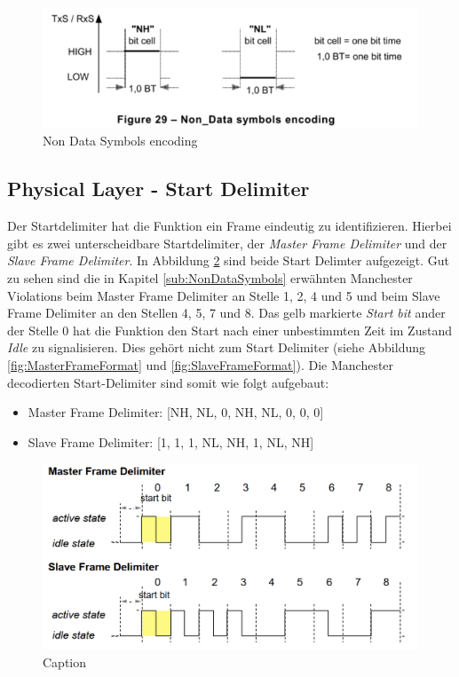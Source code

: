 \begin{figure}[H]
    \centering
    \includegraphics[width = 0.7 \textwidth]{Figures/Chap2/Grundlagen/MVB_DOKU/Layer/Non_Data_Symbol.png}
    \caption{Non Data Symbols encoding}
    \label{fig:NonDataSymbolsEncoding}
\end{figure}

\subsection{Physical Layer - Start Delimiter}
\label{sub:StartDelimiter}
Der Startdelimiter hat die Funktion ein Frame eindeutig zu identifizieren. Hierbei gibt es zwei unterscheidbare Startdelimiter, der \textit{Master Frame Delimiter} und der \textit{Slave Frame Delimiter}. In Abbildung \ref{fig:FrameDelimiterMasterSlave} sind beide Start Delimter aufgezeigt. Gut zu sehen sind die in Kapitel \ref{sub:NonDataSymbols} erwähnten Manchester Violations beim Master Frame Delimiter an Stelle 1, 2, 4 und 5 und beim Slave Frame Delimiter an den Stellen 4, 5, 7 und 8. Das gelb markierte \textit{Start bit} ander der Stelle 0 hat die Funktion den Start nach einer unbestimmten Zeit im Zustand \textit{Idle} zu signalisieren. Dies gehört nicht zum Start Delimiter (siehe Abbildung \ref{fig:MasterFrameFormat} und \ref{fig:SlaveFrameFormat}). Die Manchester decodierten Start-Delimiter sind somit wie folgt aufgebaut:

\begin{itemize}
    \item Master Frame Delimiter: [NH, NL, 0, NH, NL, 0, 0, 0]
    \item Slave Frame Delimiter: [1, 1, 1, NL, NH, 1, NL, NH]
\end{itemize}



\begin{figure}[H]
    \centering
    \includegraphics[width=0.8\linewidth]{Figures/Chap2/Grundlagen/MVB_DOKU/Layer/Frame_Delimiter.png}
    \caption{Caption}
    \label{fig:FrameDelimiterMasterSlave}
\end{figure}